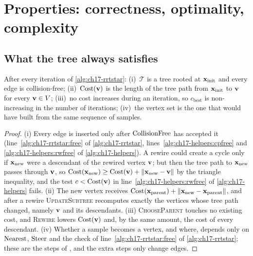\section{Properties: correctness, optimality, complexity}
\label{sec:ch17-properties}

\subsection{What the tree always satisfies}
\label{sec:ch17-invariants}

\begin{proposition}
\label{prop:ch17-invariant}
After every iteration of \cref{alg:ch17-rrtstar}:
(i)~$\mathcal{T}$ is a tree rooted at $\mathbf{x}_{\mathrm{init}}$ and every edge is
collision-free;
(ii)~$\mathrm{Cost}(\mathbf{v})$ is the length of the tree path from
$\mathbf{x}_{\mathrm{init}}$ to $\mathbf{v}$ for every $\mathbf{v}\in V$;
(iii)~no cost increases during an iteration, so $c_{\mathrm{best}}$ is
non-increasing in the number of iterations;
(iv)~the vertex set is the one that \rrt would have built from the same
sequence of samples.
\end{proposition}

\begin{proof}
(i) Every edge is inserted only after $\operatorname{CollisionFree}$ has accepted it
(line~\ref{alg:ch17-rrtstar:free} of \cref{alg:ch17-rrtstar}, lines~\ref{alg:ch17-helpers:cpfree}
and \ref{alg:ch17-helpers:rwfree} of \cref{alg:ch17-helpers}). A rewire could create a cycle only if
$\mathbf{x}_{\mathrm{new}}$ were a descendant of the rewired vertex $\mathbf{v}$; but then the
tree path to $\mathbf{x}_{\mathrm{new}}$ passes through $\mathbf{v}$, so
$\mathrm{Cost}(\mathbf{x}_{\mathrm{new}})\ge\mathrm{Cost}(\mathbf{v})+\left\lVert \mathbf{x}_{\mathrm{new}}-\mathbf{v} \right\rVert$
by the triangle inequality, and the test $c<\mathrm{Cost}(\mathbf{v})$ in
line~\ref{alg:ch17-helpers:rwfree} of \cref{alg:ch17-helpers} fails. (ii) The new vertex receives
$\mathrm{Cost}(\mathbf{x}_{\mathrm{parent}})+\left\lVert \mathbf{x}_{\mathrm{new}}-\mathbf{x}_{\mathrm{parent}} \right\rVert$,
and after a rewire \textsc{UpdateSubtree} recomputes exactly the vertices
whose tree path changed, namely $\mathbf{v}$ and its descendants. (iii)
\textsc{ChooseParent} touches no existing cost, and \textsc{Rewire} lowers
$\mathrm{Cost}(\mathbf{v})$ and, by the same amount, the cost of every descendant.
(iv) Whether a sample becomes a vertex, and where, depends only on
$\operatorname{Nearest}$, $\operatorname{Steer}$ and the check of line~\ref{alg:ch17-rrtstar:free} of
\cref{alg:ch17-rrtstar}; these are the steps of \rrt, and the extra steps
only change edges.
\end{proof}

